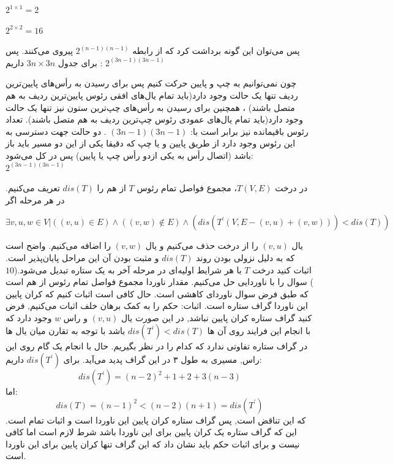 \documentclass[11pt,largemargins]{h2wp}
\begin{document}
$ 2^{1 \times 1} = 2 $

$ 2^{2 \times 2} = 16 $

پس می‌توان این گونه برداشت کرد که از رابطه ${{2}^{(n-1)(n-1)}} $ پیروی می‌کنند.
پس برای جدول $ 3n \times 3n $ داریم : ${{2}^{(3n-1)(3n-1)}} $ 
 
 
 \notes
 
 
 

چون نمی‌توانیم به چپ و پایین حرکت کنیم پس برای رسیدن به رأس‌های پایین‌ترین ردیف تنها یک حالت وجود دارد(باید تمام یال‌های افقی رئوس پایین‌ترین ردیف به هم متصل باشند)
    ، همچنین برای رسیدن به رأس‌های چپ‌ترین ستون نیز تنها یک حالت وجود دارد(باید تمام یال‌های عمودی رئوس چپ‌ترین ردیف به هم متصل باشند). تعداد رئوس باقیمانده نیز برابر است با:
        $(3n - 1)(3n - 1)$ .
دو حالت جهت دسترسی به این رئوس وجود دارد از طریق پایین و یا چپ که دقیقا یکی از این دو مسیر باید باز باشد (اتصال رأس به یکی ازدو رأس چپ یا پایین) پس در کل می‌شود: 
   ${{2}^{(3n-1)(3n-1)}} $
   
 \question
 
    در درخت $T(V, E)$، مجموع فواصل تمام رئوس $T$ از هم را $dis(T)$ تعریف می‌کنیم. در هر مرحله اگر

    \begin{center}
    $\exists v, u, w \in V | ((v, u) \in E) \land ((v, w) \notin E) \land (dis(T^\prime(V, E - (v, u) + (v, w))) < dis(T))$
    \end{center}

    یال $(v, u)$ را از درخت حذف می‌کنیم و یال $(v, w)$ را اضافه می‌کنیم. واضح است که به دلیل نزولی بودن روند $dis(T)$ و مثبت بودن آن این مراحل پایان‌پذیر است. اثبات کنید درخت $T$ با هر شرایط اولیه‌ای در مرحله آخر به یک ستاره تبدیل می‌شود.($10$)
  \solution
  سوال را با ناوردایی حل می‌کنیم.
  مقدار ناوردا مجموع فواصل تمام رئوس از هم است که طبق فرض سوال ناوردای کاهشی است.
  حال کافی است اثبات کنیم که کران پایین این ناوردا گراف ستاره است.
  اثبات:
 حکم را به کمک برهان خلف اثبات می‌کنیم, فرض کنید گراف ستاره کران پایین نباشد, در این صورت یال 
$(v,u)$
و راس
$w$
  وجود دارد که با انجام این فرایند روی آن ها 
 $dis(T^\prime) < dis(T)$
 باشد
 با توجه به تقارن میان یال ها در گراف ستاره تفاوتی ندارد که کدام را در نظر بگیریم.
  حال با انجام یک گام روی این راس, مسیری به طول ۳ در این گراف پدید می‌آید. برای 
  $dis(T^\prime)$
  داریم:
  \[dis(T^\prime)=(n-2)^2+1+2+3(n-3)\]
  اما:
  \[dis(T)=(n-1)^2<(n-2)(n+1)=dis(T^\prime)\]
  که این تناقض است, پس گراف ستاره کران پایین این ناوردا است و اثبات تمام است.  
\notes
{}
  این که گراف ستاره یک کران پایین برای این ناوردا باشد شرط لازم است اما کافی نیست و برای اثبات حکم باید نشان داد که این گراف تنها
   کران پایین برای این ناوردا است. 
\end{document}
